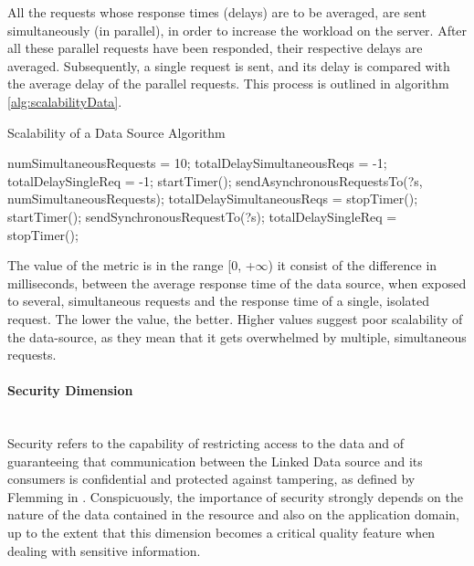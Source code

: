 All the requests whose response times (delays) are to be averaged, are sent simultaneously (in parallel), in order to increase the workload on the server. After all these parallel requests have been responded, their respective delays are averaged. Subsequently, a single request is sent, and its delay is compared with the average delay of the parallel requests. This process is outlined in algorithm \ref{alg:scalabilityData}.
\begin{algorithm}
\caption{Scalability of a Data Source Algorithm} \label{alg:scalabilityData}
\begin{algorithmic}[1]
\State numSimultaneousRequests = 10;
\State totalDelaySimultaneousReqs = -1;
\State totalDelaySingleReq = -1;
\EndProcedure
{}
\State startTimer();
\State sendAsynchronousRequestsTo(?s, numSimultaneousRequests);
\State totalDelaySimultaneousReqs = stopTimer();
\State startTimer();
\State sendSynchronousRequestTo(?s);
\State totalDelaySingleReq = stopTimer();
\EndIf
{}
\EndProcedure
\end{algorithmic}
\end{algorithm}
The value of the metric is in the range [0, +$\infty$) it consist of the difference in milliseconds, between the average response time of the data source, when exposed to several, simultaneous requests and the response time of a single, isolated request. The lower the value, the better. Higher values suggest poor scalability of the data-source, as they mean that it gets overwhelmed by multiple, simultaneous requests.



\paragraph{Security Dimension}~\\ %
Security refers to the capability of restricting access to the data and of guaranteeing that communication between the Linked Data source and its consumers is confidential and protected against tampering, as defined by Flemming in \cite{Flemming2008}. Conspicuously, the importance of security strongly depends on the nature of the data contained in the resource and also on the application domain, up to the extent that this dimension becomes a critical quality feature when dealing with sensitive information.


